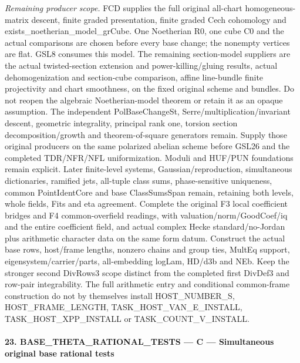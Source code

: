 \documentclass[11pt,a4paper]{article}
\numberwithin{equation}{section}
\theoremstyle{remark}\newtheorem{remark}[theorem]{Remark}
\begin{document}
\emph{Remaining producer scope.} FCD supplies the full original all-chart homogeneous-matrix descent, finite graded presentation, finite graded Cech cohomology and exists\_\allowbreak noetherian\_\allowbreak model\_\allowbreak grCube. One Noetherian R0, one cube C0 and the actual comparisons are chosen before every base change; the nonempty vertices are flat. GSL8 consumes this model. The remaining section-model suppliers are the actual twisted-section extension and power-killing/gluing results, actual dehomogenization and section-cube comparison, affine line-bundle finite projectivity and chart smoothness, on the fixed original scheme and bundles. Do not reopen the algebraic Noetherian-model theorem or retain it as an opaque assumption. The independent PolBaseChangeSt, Serre/multiplication/invariant descent, geometric integrality, principal rank one, torsion section decomposition/growth and theorem-of-square generators remain. Supply those original producers on the same polarized abelian scheme before GSL26 and the completed TDR/NFR/NFL uniformization. Moduli and HUF/PUN foundations remain explicit. Later finite-level systems, Gaussian/reproduction, simultaneous dictionaries, ramified jets, all-tuple class sums, phase-sensitive uniqueness, common PointIdentCore and base ClassSumsSpan remain, retaining both levels, whole fields, Fits and eta agreement. Complete the original F3 local coefficient bridges and F4 common-overfield readings, with valuation/norm/GoodCoef/iq and the entire coefficient field, and actual complex Hecke standard/no-Jordan plus arithmetic character data on the same form datum. Construct the actual base rows, host/frame lengths, nonzero chains and group ties, MultEq support, eigensystem/carrier/parts, all-embedding logLam, HD/d3b and NEb. Keep the stronger second DivRows3 scope distinct from the completed first DivDef3 and row-pair integrability. The full arithmetic entry and conditional common-frame construction do not by themselves install HOST\_\allowbreak NUMBER\_\allowbreak S, HOST\_\allowbreak FRAME\_\allowbreak LENGTH, TASK\_\allowbreak HOST\_\allowbreak VAN\_\allowbreak E\_\allowbreak INSTALL, TASK\_\allowbreak HOST\_\allowbreak XPP\_\allowbreak INSTALL or TASK\_\allowbreak COUNT\_\allowbreak V\_\allowbreak INSTALL.



\paragraph{23. BASE\_\allowbreak THETA\_\allowbreak RATIONAL\_\allowbreak TESTS — C — Simultaneous original base rational tests}
\end{document}
